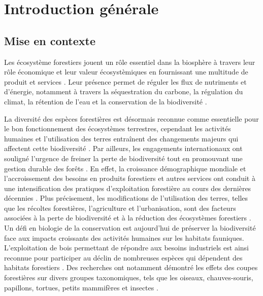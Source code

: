 \chapter*{Introduction générale}         %
\label{chap-introduction}       %


\section*{Mise en contexte}
\label{sec:contexte}

Les écosystème forestiers jouent un rôle essentiel dans la biosphère à travers leur rôle économique et leur valeur écosystèmiques en fournissant une multitude de produit et services \citep{Balvanera2006Quantifyingevidence}. 
Leur présence permet de réguler les flux de nutriments et d'énergie, notamment à travers la séquestration du carbone, la régulation du climat, la rétention de l'eau et la conservation de la biodiversité \citep{Balvanera2006Quantifyingevidence,Diaz2006BiodiversityLoss,Canadell2008Managingforests,Pawson2013Plantationforests}. 

La diversité des espèces forestières est désormais reconnue comme essentielle pour le bon fonctionnement des écosystèmes terrestres, cependant les activités humaines et l'utilisation des terres entraînent des changements majeurs qui affectent cette biodiversité \citep{Newbold2015Globaleffects}.
Par ailleurs, les engagements internationaux ont souligné l'urgence de freiner la perte de biodiversité tout en promouvant une gestion durable des forêts \citep{Scherer-Lorenzen2005ForestDiversity,Parviainen2007Maintenanceconservation}. 
En effet, la croissance démographique mondiale et l'accroissement des besoins en produits forestiers et autres services ont conduit à une intensification des pratiques d'exploitation forestière au cours des dernières décennies \citep{Foley2005GlobalConsequences}. 
Plus précisement, les modifications de l'utilisation des terres, telles que les récoltes forestières, l'agriculture et l'urbanisation, sont des facteurs associées à la perte de biodiversité et à la réduction des écosystèmes forestiers \citep{Sala2000Globalbiodiversity,Naeem2012functionsbiological,Bichet2016Maintaininganimal}.
Un défi en biologie de la conservation est aujourd'hui de préserver la biodiversité face aux impacts croissants des activités humaines sur les habitats fauniques. 
L'exploitation de bois permettant de répondre aux besoins industriels est ainsi reconnue pour participer au déclin de nombreuses espèces qui dépendent des habitats forestiers \citep{Bengtsson2000Biodiversitydisturbances}. 
Des recherches ont notamment démontré les effets des coupes forestières sur divers groupes taxonomiques, tels que les oiseaux, chauves-souris, papillons, tortues, petits mammifères et insectes \citep{Summerville2011Managingforest,Currylow2012ShortTermForest,Kaminski2013EffectsForest,Kellner2013Shorttermresponses,Caldwell2019ComparisonBat}.

